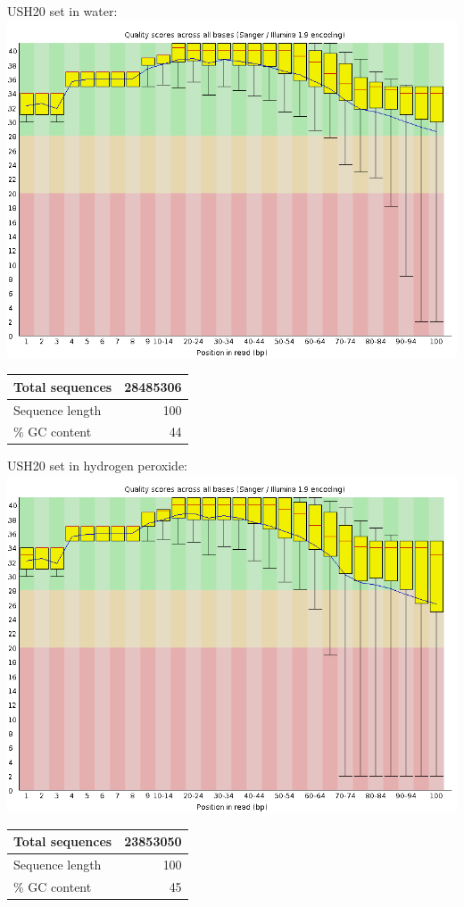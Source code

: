 \documentclass{article}
\begin{document}
\begin{center}
USH20 set in water: \\
\includegraphics[scale=0.3]{ush20_h20_r1_basequal.png} \\
	\begin{tabular}{| l | r |}
	\hline
	Total sequences & 28485306 \\ \hline
	Sequence length & 100 \\ \hline
	\% GC content & 44 \\ \hline
	\end{tabular}

USH20 set in hydrogen peroxide: \\
\includegraphics[scale=0.3]{ush20_h202_r1_basequal.png} \\
	\begin{tabular}{| l | r |}
	\hline
	Total sequences & 23853050 \\ \hline
	Sequence length & 100 \\ \hline
	\% GC content & 45 \\ \hline
	\end{tabular}
\end{center}
\end{document}
